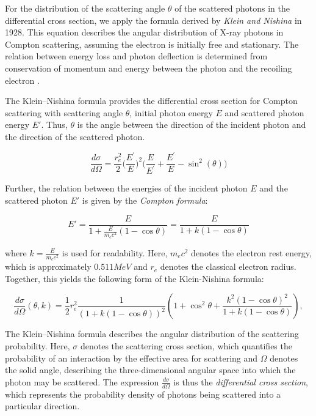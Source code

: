 For the distribution of the scattering angle $\theta$ of the scattered photons
in the differential cross section, we apply the formula derived by \emph{Klein
and Nishina} in 1928. This equation describes the angular distribution of X-ray
photons in Compton scattering, assuming the electron is initially free and
stationary. The relation between energy loss and photon deflection is determined
from conservation of momentum and energy between the photon and the recoiling
electron \cite{hubbell1969photon,klein1928scattering}.

The Klein--Nishina formula provides the differential cross section for Compton
scattering with scattering angle $\theta$, initial photon energy $E$ and
scattered photon energy $E'$. Thus, $\theta$ is the angle between the direction
of the incident photon and the direction of the scattered photon.

$$ \frac{d\sigma}{d\Omega} = \frac{r_e^2}{2}
\bigg(\frac{E^\prime}{E}\bigg)^2 \bigg(\frac{E}{E^\prime} + \frac{E^\prime}{E} -
\sin^2(\theta)\bigg) $$

Further, the relation
between the energies of the incident photon $E$ and the scattered photon $E'$ is
given by the \emph{Compton formula}:

\begin{equation}
    E' = \frac{E}{1 + \frac{E}{m_e c^2} (1 - \cos \theta)} = \frac{E}{1 + k(1 - \cos \theta)}
    \label{eq:compton_formula}
\end{equation}

where $k=\tfrac{E}{m_ec^2}$ is used for readability.
Here, $m_ec^2$ denotes the electron rest energy, which is approximately $0.511 MeV$ and $r_e$ denotes the classical
electron radius. Together, this yields the following form of the Klein-Nishina formula:

\begin{equation}
    \label{eq:kleinNishina}
    \frac{d\sigma}{d\Omega} (\theta, k)= \frac{1}{2} r_e^2 
    \frac{1}{(1 + k(1 - \cos \theta))^2} \left( 1 + \cos^2 \theta + 
    \frac{k^2 (1 - \cos \theta)^2}{1+ k(1 - \cos \theta)} \right),
\end{equation}

The Klein--Nishina formula describes the angular distribution of the scattering
probability. Here, $\sigma$ denotes the scattering cross section, which
quantifies the probability of an interaction by the effective area for
scattering and $\Omega$ denotes the solid angle, describing the
three-dimensional angular space into which the photon may be scattered. The
expression $\tfrac{d\sigma}{d\Omega}$ is thus the \emph{differential cross
section}, which represents the probability density of photons being scattered
into a particular direction. 

